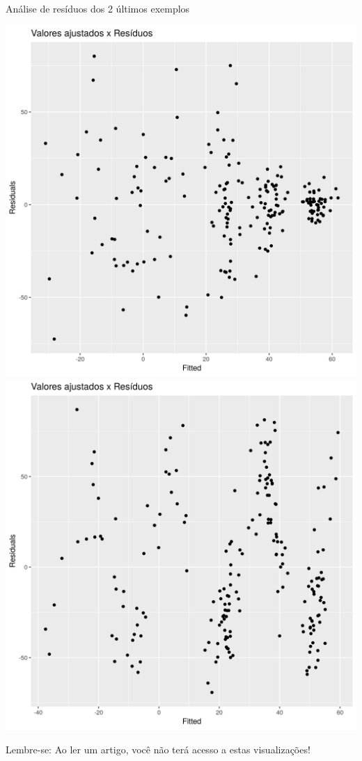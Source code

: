 \documentclass{beamer}
\begin{document}
\begin{frame}{\small Análise de resíduos dos 2 últimos exemplos}
  \begin{center}
    \includegraphics[height=.6\textheight]{Cap18-19/pratica-plot-heterocedasticidade-resid}
    \includegraphics[height=.6\textheight]{Cap18-19/pratica-plot-heterocedasticidade-sin-resid}

    \vfill
    \scriptsize
    Lembre-se: Ao ler um artigo, você não terá acesso a estas visualizações!
  \end{center}
\end{frame}
\end{document}

